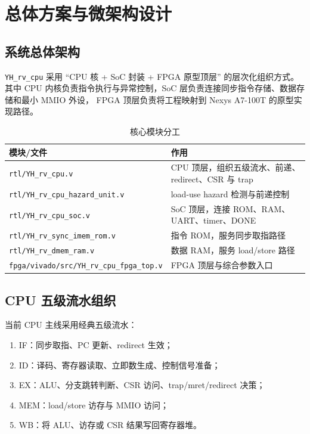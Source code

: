 \section{总体方案与微架构设计}

\subsection{系统总体架构}

\texttt{YH\_rv\_cpu} 采用 ``CPU 核 + SoC 封装 + FPGA 原型顶层'' 的层次化组织方式。
其中 CPU 内核负责指令执行与异常控制，SoC 层负责连接同步指令存储、数据存储和最小 MMIO 外设，
FPGA 顶层负责将工程映射到 Nexys A7-100T 的原型实现路径。

\begin{table}[H]
    \centering
    \caption{核心模块分工}
    \begin{tabular}{p{} p{}}
        \toprule
        模块/文件 & 作用 \\
        \midrule
        \texttt{rtl/YH\_rv\_cpu.v} & CPU 顶层，组织五级流水、前递、redirect、CSR 与 trap \\
        \texttt{rtl/YH\_rv\_cpu\_hazard\_unit.v} & load-use hazard 检测与前递控制 \\
        \texttt{rtl/YH\_rv\_cpu\_soc.v} & SoC 顶层，连接 ROM、RAM、UART、timer、DONE \\
        \texttt{rtl/YH\_rv\_sync\_imem\_rom.v} & 指令 ROM，服务同步取指路径 \\
        \texttt{rtl/YH\_rv\_dmem\_ram.v} & 数据 RAM，服务 load/store 路径 \\
        \texttt{fpga/vivado/src/YH\_rv\_cpu\_fpga\_top.v} & FPGA 顶层与综合参数入口 \\
        \bottomrule
    \end{tabular}
\end{table}


\subsection{CPU 五级流水组织}

当前 CPU 主线采用经典五级流水：

\begin{enumerate}
    \item IF：同步取指、PC 更新、redirect 生效；
    \item ID：译码、寄存器读取、立即数生成、控制信号准备；
    \item EX：ALU、分支跳转判断、CSR 访问、trap/mret/redirect 决策；
    \item MEM：load/store 访存与 MMIO 访问；
    \item WB：将 ALU、访存或 CSR 结果写回寄存器堆。
\end{enumerate}

